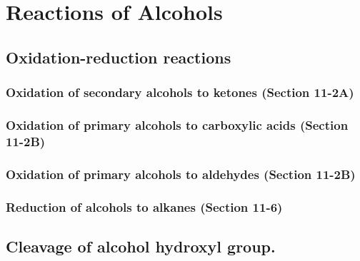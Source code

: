 \section{Reactions of Alcohols}


\subsection{Oxidation-reduction reactions}

\subsubsection{Oxidation of secondary alcohols to ketones \normalfont(Section 11-2A)}


\subsubsection{Oxidation of primary alcohols to carboxylic acids \normalfont(Section 11-2B)}


\subsubsection{Oxidation of primary alcohols to aldehydes \normalfont(Section 11-2B)}


\subsubsection{Reduction of alcohols to alkanes \normalfont(Section 11-6)}



\subsection{Cleavage of alcohol hydroxyl group.}

